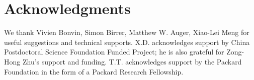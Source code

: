 \documentclass[apj]{emulateapj}
\begin{document}
\section*{Acknowledgments}
We thank Vivien Bonvin, Simon Birrer, Matthew W. Auger, Xiao-Lei Meng for useful suggestions and technical supports. X.D. acknowledges support by China Postdoctoral Science Foundation Funded Project; he is also grateful for Zong-Hong Zhu's support and funding. T.T. acknowledges support by the Packard Foundation in the form of a Packard Research Fellowship.





\end{document}
